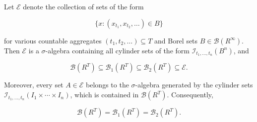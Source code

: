 Let $\mathcal{E}$ denote the collection of sets of the form

$$\{x: (x_{t_1}, x_{t_2}, \ldots) \in B\}$$

for various countable aggregates $(t_1, t_2, \ldots) \subseteq T$ and Borel sets $B \in \mathcal{B}(R^\infty)$. Then $\mathcal{E}$ is a $\sigma$-algebra containing all cylinder sets of the form $\mathcal{I}_{t_1, \ldots, t_n}(B^n)$, and

$$\mathcal{B}(R^T) \subseteq \mathcal{B}_1(R^T) \subseteq \mathcal{B}_2(R^T) \subseteq \mathcal{E}.$$

Moreover, every set $A \in \mathcal{E}$ belongs to the $\sigma$-algebra generated by the cylinder sets $\mathcal{I}_{t_1, \ldots, t_n}(I_1 \times \cdots \times I_n)$, which is contained in $\mathcal{B}(R^T)$. Consequently,

$$\mathcal{B}(R^T) = \mathcal{B}_1(R^T) = \mathcal{B}_2(R^T).$$
